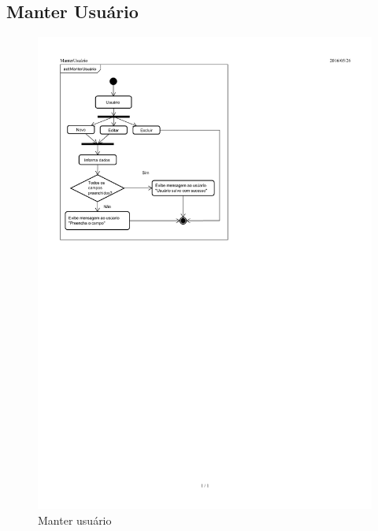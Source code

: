\documentclass[chapter=TITLE,12pt,oneside,a4paper,english,french,sumario=tradicional,spanish,brazil,]{abntex2}
\begin{document}
\subsection{Manter Usuário}
\begin{figure}[h]\centering
	\includegraphics[scale=1.63]{usuario.pdf}\caption{Manter usuário}
\end{figure}

\newpage
\end{document}
